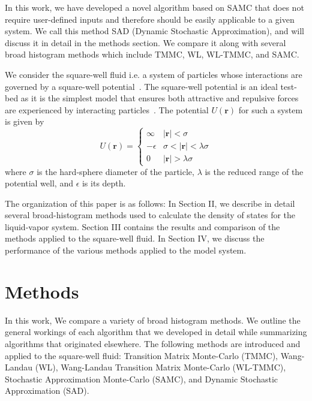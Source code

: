 \documentclass[letterpaper,twocolumn,amsmath,amssymb,pre,aps,10pt]{revtex4-1}
\begin{document}
In this work, we have developed a novel algorithm based on SAMC that
does not require user-defined inputs and therefore should be easily
applicable to a given system.  We call this method SAD (Dynamic
Stochastic Approximation), and will discuss it in detail in the methods
section. We compare it along with several broad histogram methods
which include TMMC, WL, WL-TMMC, and SAMC.

We consider the square-well fluid i.e. a system of particles whose
interactions are governed by a square-well
potential~\cite{singh2003surface, barker2004perturbationSW}.  The
square-well potential is an ideal test-bed as it is the simplest model
that ensures both attractive and repulsive forces are experienced by
interacting particles~\cite{barker1967-SW-perturbation, vega1992phase}.
The potential $U(\textbf{r})$ for such a system is given by
\begin{equation}
 U(\textbf{r})=\begin{cases} \infty &
 \lvert\textbf{r}\rvert< \sigma\\-\epsilon &
 \sigma<\lvert\textbf{r}\rvert<\lambda\sigma\\0 &
 \lvert\textbf{r}\rvert > \lambda\sigma\end{cases}
\end{equation}
where $\sigma$ is the hard-sphere diameter of the particle, $\lambda$ is the
reduced range of the potential well, and $\epsilon$ is its depth.

The organization of this paper is as follows: In Section II, we
describe in detail several broad-histogram methods used to calculate
the density of states for the liquid-vapor system.  Section III
contains the results and comparison of the methods applied to the
square-well fluid.  In Section IV, we discuss the performance of the
various methods applied to the model system.

\section{Methods}

In this work, We compare a variety of broad histogram methods.  We
outline the general workings of each algorithm that we developed in
detail while summarizing algorithms that originated elsewhere.  The
following methods are introduced and applied to the square-well fluid:
Transition Matrix Monte-Carlo (TMMC), Wang-Landau (WL), Wang-Landau
Transition Matrix Monte-Carlo (WL-TMMC), Stochastic Approximation
Monte-Carlo (SAMC), and Dynamic Stochastic Approximation 
(SAD).
\end{document}
